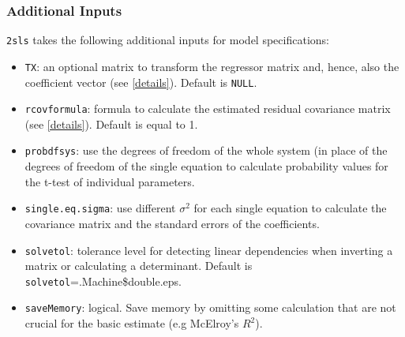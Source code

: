 \subsubsection{Additional Inputs}
\texttt{2sls} takes the following additional inputs for model
specifications:
\begin{itemize}
\item \texttt{TX}: an optional matrix to transform the regressor
matrix and, hence, also the coefficient vector (see \ref{details}). Default is \texttt{NULL}.
\item \texttt{rcovformula}: formula to calculate the estimated residual covariance
matrix (see \ref{details}). Default is equal to 1.
\item \texttt{probdfsys}: use the degrees of freedom of the whole system
(in place of the degrees of freedom of the single equation to calculate probability
values for the t-test of individual parameters. 
\item \texttt{single.eq.sigma}: use different $\sigma^2$ for each single
equation to calculate the covariance matrix and the standard errors of the coefficients.
\item \texttt{solvetol}: tolerance level for detecting linear dependencies when 
inverting a matrix or calculating a determinant. Default is \texttt {solvetol}=.Machine\$double.eps.
\item \texttt{saveMemory}: logical. Save memory by omitting some calculation that are
not crucial for the basic estimate (e.g McElroy's $R^2$).
\end{itemize}
